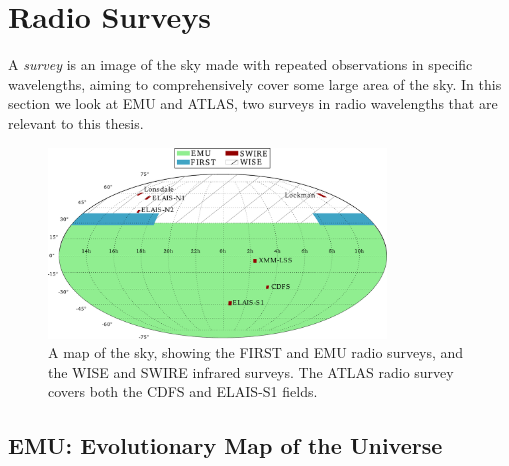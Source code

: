     \section{Radio Surveys}
    \label{sec:radio-surveys}

        A \emph{survey} is an image of the sky made with repeated observations
        in specific wavelengths, aiming to comprehensively cover some large area
        of the sky. In this section we look at EMU and ATLAS, two surveys in
        radio wavelengths that are relevant to this thesis.

        \begin{figure}[!ht]
            \centering
            \includegraphics[width=0.8\textwidth]{images/skymap.pdf}
            \caption{A map of the sky, showing the FIRST and EMU radio surveys,
                and the WISE and SWIRE infrared surveys. The ATLAS radio survey
                covers both the CDFS and ELAIS-S1 fields.}
        \end{figure}

        \subsection{EMU: Evolutionary Map of the Universe}
        \label{sec:emu}

